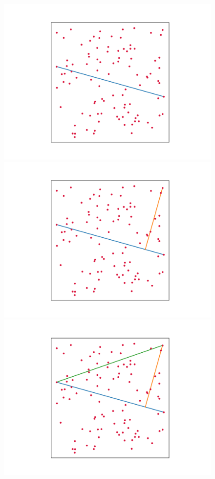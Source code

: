 \documentclass[]{finalproject}
\begin{document}
\begin{figure}[H]
    \centering
    \begin{minipage}{.33\linewidth}
		\includegraphics[width=\linewidth]{quickhull1.png}
	\end{minipage}
	\begin{minipage}{.33\linewidth}
		\includegraphics[width=\linewidth]{quickhull2.png}
	\end{minipage}
    \begin{minipage}{.33\linewidth}
		\includegraphics[width=\linewidth]{quickhull3.png}

\end{minipage}
\end{figure}
\end{document}

